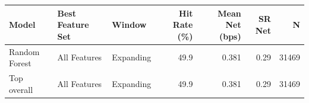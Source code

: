 \begin{tabular}{lllrrrr}
\toprule
Model & Best Feature Set & Window & Hit Rate (\%) & Mean Net (bps) & SR Net & N \\
\midrule
Random Forest & All Features & Expanding & 49.9 & 0.381 & 0.29 & 31469 \\
\midrule
Top overall & All Features & Expanding & 49.9 & 0.381 & 0.29 & 31469 \\
\bottomrule
\end{tabular}
